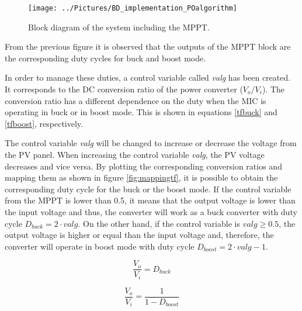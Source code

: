 \begin{figure}[H]
	\begin{center}
		\texttt{[image: ../Pictures/BD\_implementation\_POalgorithm]}
		\caption{Block diagram of the system including the MPPT.}
		\label{BD_POalgorithm}
	\end{center}	
\end{figure}

From the previous figure it is observed that the outputs of the MPPT block are the corresponding duty cycles for buck and boost mode. 

In order to manage these duties, a control variable called \textit{valg} has been created. It corresponds to the DC conversion ratio of the power converter ($V_{o}/V_{i}$). The conversion ratio has a different dependence on the duty when the MIC is operating in buck or in boost mode. This is shown in equations \ref{tfbuck} and \ref{tfboost}, respectively. 

The control variable \textit{valg} will be changed to increase or decrease the voltage from the PV panel. When increasing the control variable \textit{valg}, the PV voltage decreases and vice versa.
By plotting the corresponding conversion ratios and mapping them as shown in figure \ref{fig:mappingtf}, it is possible to obtain the corresponding duty cycle for the buck or the boost mode. If the control variable from the MPPT is lower than 0.5, it  means that the output voltage is lower than the input voltage and thus, the converter will work as a buck converter with duty cycle $D_{buck}=2 \cdot valg$. On the other hand, if the control variable is $valg \geq 0.5$, the output voltage is higher or equal than the input voltage and, therefore, the converter will operate in boost mode with duty cycle $D_{boost}=2\cdot valg - 1$. %

\vspace{1cm}
\begin{minipage}{0.3\linewidth}
	\begin{equation}	\label{tfbuck}
	\frac{V_o}{V_i} = D_{buck}
	\end{equation}

\end{minipage}%
\begin{minipage}{0.5\linewidth}	
	\begin{equation}	\label{tfboost}
	\frac{V_o}{V_i}= \frac{1}{1-D_{boost}}
	\end{equation}

\end{minipage}

